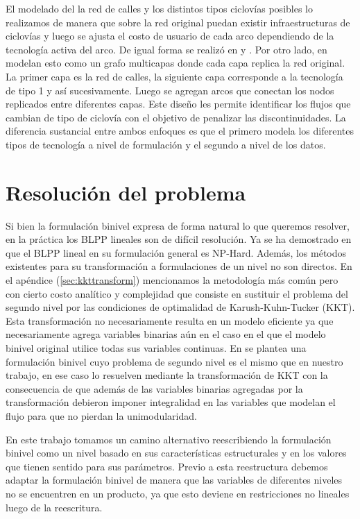 \documentclass{article}
\begin{document}
  El modelado del la red de calles y los distintos tipos ciclovías posibles lo realizamos de manera que sobre la red original puedan existir infraestructuras de ciclovías y luego se ajusta el costo de usuario de cada arco dependiendo de la tecnología activa del arco. De igual forma se realizó en \cite{Lin2013} y \cite{Zhu2019}. Por otro lado, en \cite{baya2021} modelan esto como un grafo multicapas donde cada capa replica la red original. La primer capa es la red de calles, la siguiente capa corresponde a la tecnología de tipo 1 y así sucesivamente. Luego se agregan arcos que conectan los nodos replicados entre diferentes capas. Este diseño les permite identificar los flujos que cambian de tipo de ciclovía con el objetivo de penalizar las discontinuidades. La diferencia sustancial entre ambos enfoques es que el primero modela los diferentes tipos de tecnología a nivel de formulación y el segundo a nivel de los datos.

  \section{Resolución del problema}
  \label{sect:problemresolution}

  Si bien la formulación binivel expresa de forma natural lo que queremos resolver, en la práctica los BLPP lineales son de difícil resolución. Ya se ha demostrado en \cite{bardbook} que el BLPP lineal en su formulación general es NP-Hard. Además, los métodos existentes para su transformación a formulaciones de un nivel no son directos. En el apéndice (\ref{sec:kkttransform}) mencionamos la metodología más común pero con cierto costo analítico y complejidad que consiste en sustituir el problema del segundo nivel por las condiciones de optimalidad de Karush-Kuhn-Tucker (KKT). Esta transformación no necesariamente resulta en un modelo eficiente ya que necesariamente agrega variables binarias aún en el caso en el que el modelo binivel original utilice todas sus variables continuas. En \cite{kara2004} se plantea una formulación binivel cuyo problema de segundo nivel es el mismo que en nuestro trabajo, en ese caso lo resuelven mediante la transformación de KKT con la consecuencia de que además de las variables binarias agregadas por la transformación debieron imponer integralidad en las variables que modelan el flujo para que no pierdan la unimodularidad.

  En este trabajo tomamos un camino alternativo reescribiendo la formulación binivel como un nivel basado en sus características estructurales y en los valores que tienen sentido para sus parámetros. Previo a esta reestructura debemos adaptar la formulación binivel de manera que las variables de diferentes niveles no se encuentren en un producto, ya que esto deviene en restricciones no lineales luego de la reescritura.
\end{document}
